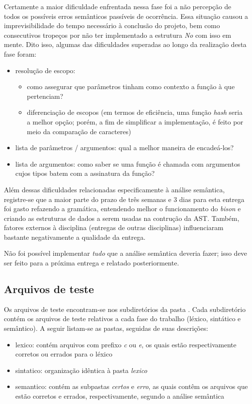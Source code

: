 \documentclass[
	article,			%
	11pt,				%
	oneside,			%
	a4paper,			%
	english,			%
	brazil,				%
	sumario=tradicional
	]{abntex2}
\renewcommand{\it}[1]{\textit{#1}}
\begin{document}
Certamente a maior dificuldade enfrentada nessa fase foi a não percepção de todos os possíveis erros semânticos passíveis de ocorrência. Essa situação causou a imprevisibilidade do tempo necessário à conclusão do projeto, bem como consecutivos tropeços por não ter implementado a estrutura \it{No} com isso em mente. Dito isso, algumas das dificuldades superadas ao longo da realização desta fase foram:
\begin{itemize}
	\item resolução de escopo:
		\begin{itemize}
			\item como assegurar que parâmetros tinham como contexto a função à que pertenciam?
			\item diferenciação de escopos (em termos de eficiência, uma função \it{hash} seria a melhor opção; porém, a fim de simplificar a implementação, é feito por meio da comparação de caracteres)
		\end{itemize}	 
	\item lista de parâmetros / argumentos: qual a melhor maneira de encadeá-los?
	\item lista de argumentos: como saber se uma função é chamada com argumentos cujos tipos batem com a assinatura da função?	
\end{itemize}

Além dessas dificuldades relacionadas especificamente à análise semântica, registre-se que a maior parte do prazo de três semanas e 3 dias para esta entrega foi gasto refazendo a gramática, entendendo melhor o funcionamento do \it{bison} e criando as estruturas de dados a serem usadas na contrução da AST. Também,
fatores externos à disciplina (entregas de outras disciplinas) influenciaram bastante negativamente a
qualidade da entrega.

Não foi possível implementar \it{tudo} que a análise semântica deveria fazer; isso deve ser feito para a próxima entrega e relatado posteriormente.

\subsection{Arquivos de teste}
Os arquivos de teste encontram-se nos subdiretórios da pasta \href{https://github.com/maffei2443/unb_tradutores/tree/new_master/trab4/test}{}. Cada subdiretório contém os arquivos de teste relativos a cada fase do trabalho (léxico, sintático e semântico). A seguir listam-se as pastas, seguidas de suas descrições:
\begin{itemize}
	\item lexico: contém arquivos com prefixo \it{c} ou \it{e}, os quais estão respectivamente corretos ou errados para o léxico
	\item sintatico: organização idêntica à pasta \it{lexico}
	\item semantico: contém as subpastas \it{certos} e \it{erro}, as quais contêm os arquivos que estão corretos e errados, respectivamente, segundo a análise semântica
\end{itemize}
\end{document}
